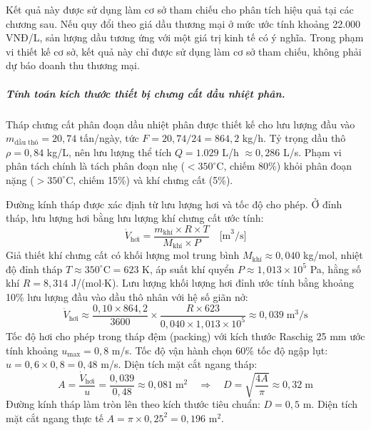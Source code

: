 \documentclass[../main.tex]{subfiles}
\begin{document}
Kết quả này được sử dụng làm cơ sở tham chiếu cho phân tích hiệu quả tại các chương sau. Nếu quy đổi theo giá dầu thương mại ở mức ước tính khoảng 22.000\,VNĐ/L, sản lượng dầu tương ứng với một giá trị kinh tế có ý nghĩa. Trong phạm vi thiết kế cơ sở, kết quả này chỉ được sử dụng làm cơ sở tham chiếu, không phải dự báo doanh thu thương mại.

\subparagraph{Tính toán kích thước thiết bị chưng cất dầu nhiệt phân.}

Tháp chưng cất phân đoạn dầu nhiệt phân được thiết kế cho lưu lượng đầu vào $m_{\text{dầu thô}} = 20{,}74$ tấn/ngày, tức $F = 20{,}74 / 24 = 864{,}2$ kg/h. Tỷ trọng dầu thô $\rho = 0{,}84$ kg/L, nên lưu lượng thể tích $Q = 1.029$ L/h $\approx 0{,}286$ L/s. Phạm vi phân tách chính là tách phân đoạn nhẹ ($< 350^\circ\mathrm{C}$, chiếm 80\%) khỏi phân đoạn nặng ($> 350^\circ\mathrm{C}$, chiếm 15\%) và khí chưng cất (5\%).

Đường kính tháp được xác định từ lưu lượng hơi và tốc độ cho phép. Ở đỉnh tháp, lưu lượng hơi bằng lưu lượng khí chưng cất ước tính:
\begin{equation}
\dot{V}_{\text{hơi}} = \frac{m_{\text{khí}} \times R \times T}{M_{\text{khí}} \times P} \quad \text{[m}^3\text{/s]}
\end{equation}
Giả thiết khí chưng cất có khối lượng mol trung bình $M_{\text{khí}} \approx 0{,}040$ kg/mol, nhiệt độ đỉnh tháp $T \approx 350^\circ\mathrm{C} = 623$ K, áp suất khí quyển $P \approx 1{,}013 \times 10^5$ Pa, hằng số khí $R = 8{,}314$ J/(mol$\cdot$K). Lưu lượng khối lượng hơi đỉnh ước tính bằng khoảng 10\% lưu lượng đầu vào dầu thô nhân với hệ số giãn nở:
\begin{equation}
\dot{V}_{\text{hơi}} \approx \frac{0{,}10 \times 864{,}2}{3600} \times \frac{R \times 623}{0{,}040 \times 1{,}013 \times 10^5} \approx 0{,}039 \;\text{m}^3\text{/s}
\end{equation}
Tốc độ hơi cho phép trong tháp đệm (packing) với kích thước Raschig 25 mm ước tính khoảng $u_{\max} = 0{,}8$ m/s. Tốc độ vận hành chọn 60\% tốc độ ngập lụt: $u = 0{,}6 \times 0{,}8 = 0{,}48$ m/s. Diện tích mặt cắt ngang tháp:
\begin{equation}
A = \frac{\dot{V}_{\text{hơi}}}{u} = \frac{0{,}039}{0{,}48} \approx 0{,}081 \;\text{m}^2 \quad \Rightarrow \quad D = \sqrt{\frac{4A}{\pi}} \approx 0{,}32 \;\text{m}
\end{equation}
Đường kính tháp làm tròn lên theo kích thước tiêu chuẩn: $D = 0{,}5$ m. Diện tích mặt cắt ngang thực tế $A = \pi \times 0{,}25^2 = 0{,}196$ m$^2$.
\end{document}
